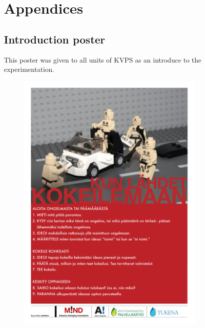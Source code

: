 
\chapter*{Appendices}
\thispagestyle{headings}

\listofappendices{}
\clearpage


\renewcommand\thesection{\Alph{section}}

\section{Introduction poster}
\label{introposter}
This poster was given to all units of KVPS as an introduce to the experimentation. 
\bigskip

\begin{figure}[ht]
           \includegraphics[width=0.83\textwidth]{juliste.pdf}
\end{figure}

